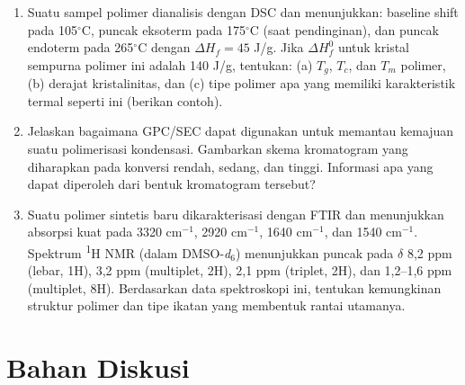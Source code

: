 \documentclass[12pt,a4paper,openany]{book}
\begin{document}
\begin{enumerate}
\item Suatu sampel polimer dianalisis dengan DSC dan menunjukkan: baseline shift pada 105$^\circ$C, puncak eksoterm pada 175$^\circ$C (saat pendinginan), dan puncak endoterm pada 265$^\circ$C dengan $\Delta H_f = 45$ J/g. Jika $\Delta H_f^0$ untuk kristal sempurna polimer ini adalah 140 J/g, tentukan: (a) $T_g$, $T_c$, dan $T_m$ polimer, (b) derajat kristalinitas, dan (c) tipe polimer apa yang memiliki karakteristik termal seperti ini (berikan contoh).

\item Jelaskan bagaimana GPC/SEC dapat digunakan untuk memantau kemajuan suatu polimerisasi kondensasi. Gambarkan skema kromatogram yang diharapkan pada konversi rendah, sedang, dan tinggi. Informasi apa yang dapat diperoleh dari bentuk kromatogram tersebut?

\item Suatu polimer sintetis baru dikarakterisasi dengan FTIR dan menunjukkan absorpsi kuat pada 3320 cm$^{-1}$, 2920 cm$^{-1}$, 1640 cm$^{-1}$, dan 1540 cm$^{-1}$. Spektrum \textsuperscript{1}H NMR (dalam DMSO-\textit{d}$_6$) menunjukkan puncak pada $\delta$ 8,2 ppm (lebar, 1H), 3,2 ppm (multiplet, 2H), 2,1 ppm (triplet, 2H), dan 1,2--1,6 ppm (multiplet, 8H). Berdasarkan data spektroskopi ini, tentukan kemungkinan struktur polimer dan tipe ikatan yang membentuk rantai utamanya.

\end{enumerate}


\section{Bahan Diskusi}
\end{document}
